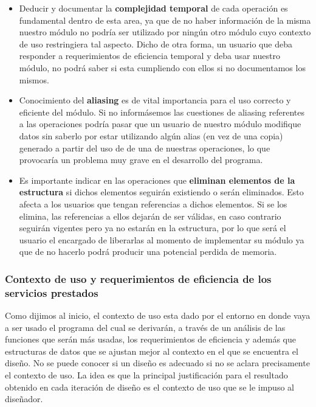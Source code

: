 \begin{itemize}
 \item Deducir y documentar la \textbf{complejidad temporal} de cada operaci\'on es fundamental dentro de esta area, ya que de no haber informaci\'on de la misma nuestro m\'odulo no podr\'ia ser utilizado por ning\'un otro m\'odulo cuyo contexto de uso restringiera tal aspecto. Dicho de otra forma, un usuario que deba responder a requerimientos de eficiencia temporal y deba usar nuestro m\'odulo, no podr\'a saber si esta cumpliendo con ellos si no documentamos los mismos.
 \item Conocimiento del \textbf{aliasing} es de vital importancia para el uso correcto y eficiente del m\'odulo. Si no inform\'asemos las cuestiones de aliasing referentes a las operaciones podr\'ia pasar que un usuario de nuestro m\'odulo modifique datos sin saberlo por estar utilizando alg\'un alias (en vez de una copia) generado a partir del uso de de una de nuestras operaciones, lo que provocar\'ia un problema muy grave en el desarrollo del programa.
 \item Es importante indicar en las operaciones que \textbf{eliminan elementos de la estructura} si dichos elementos seguir\'an existiendo o ser\'an eliminados. Esto afecta a los usuarios que tengan referencias a dichos elementos. Si se los elimina, las referencias a ellos dejar\'an de ser v\'alidas, en caso contrario seguir\'an vigentes pero ya no estar\'an en la estructura, por lo que ser\'a el usuario el encargado de liberarlas al momento de implementar su m\'odulo ya que de no hacerlo podr\'a producir una potencial perdida de memoria.
\end{itemize}

\subsubsection{Contexto de uso y requerimientos de eficiencia de los servicios prestados}

Como dijimos al inicio, el contexto de uso esta dado por el entorno en donde vaya a ser usado el programa del cual se derivar\'an, a trav\'es de un an\'alisis de las funciones que ser\'an m\'as usadas, los requerimientos de eficiencia y adem\'as que estructuras de datos que se ajustan mejor al contexto en el que se encuentra el dise\~no. No se puede conocer si un dise\~no es adecuado si no se aclara precisamente el contexto de uso. La idea es que la principal justificaci\'on para el resultado obtenido en cada iteraci\'on de dise\~no es el contexto de uso que se le impuso al dise\~nador.

